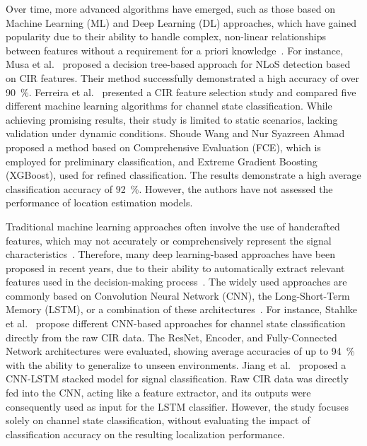 Over time, more advanced algorithms have emerged, such as those based on Machine Learning (ML) and Deep Learning (DL) approaches, which have gained popularity due to their ability to handle complex, non-linear relationships between features without a requirement for a priori knowledge~\cite{yu2018novel, pei2024fcn}. For instance, Musa et al.~\cite{musa2019decision} proposed a decision tree-based approach for NLoS detection based on CIR features. Their method successfully demonstrated a high accuracy of over \SI{90}{\percent}. Ferreira et al.~\cite{ferreira2021feature} presented a CIR feature selection study and compared five different machine learning algorithms for channel state classification. While achieving promising results, their study is limited to static scenarios, lacking validation under dynamic conditions. Shoude Wang and Nur Syazreen Ahmad~\cite{wang2024robust} proposed a method based on Comprehensive Evaluation (FCE), which is employed for preliminary classification, and Extreme Gradient Boosting (XGBoost), used for refined classification. The results demonstrate a high average classification accuracy of \SI{92}{\percent}. However, the authors have not assessed the performance of location estimation models.

Traditional machine learning approaches often involve the use of handcrafted features, which may not accurately or comprehensively represent the signal characteristics~\cite{abbasi2021novel}. Therefore, many deep learning-based approaches have been proposed in recent years, due to their ability to automatically extract relevant features used in the decision-making process~\cite{shaheen2016impact}. The widely used approaches are commonly based on Convolution Neural Network (CNN), the Long-Short-Term Memory (LSTM), or a combination of these architectures~\cite{pei2024fcn}. For instance, Stahlke et al.~\cite{stahlke2020nlos} propose different CNN-based approaches for channel state classification directly from the raw CIR data. The ResNet, Encoder, and Fully-Connected Network architectures were evaluated, showing average accuracies of up to \SI{94}{\percent} with the ability to generalize to unseen environments. Jiang et al.~\cite{jiang2020uwb} proposed a CNN-LSTM stacked model for signal classification. Raw CIR data was directly fed into the CNN, acting like a feature extractor, and its outputs were consequently used as input for the LSTM classifier. However, the study focuses solely on channel state classification, without evaluating the impact of classification accuracy on the resulting localization performance.

